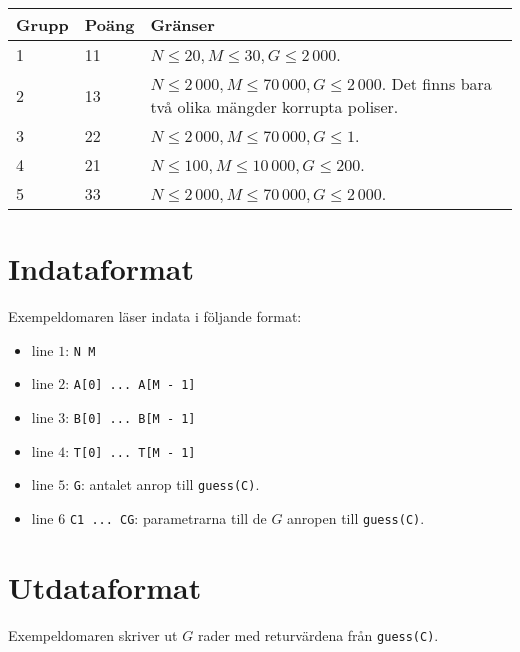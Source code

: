 \begin{tabular}{|l|l|l|}
  \hline
  \textbf{Grupp} & \textbf{Poäng} & \textbf{Gränser} \\ \hline
  1 & 11 & $N \le 20, M \le 30, G \le 2\,000$. \\ \hline
  2 & 13 & $N \le 2\,000, M \le 70\,000, G \le 2\,000$. Det finns bara två olika mängder korrupta poliser. \\ \hline
  3 & 22 & $N \le 2\,000, M \le 70\,000, G \le 1$. \\ \hline
  4 & 21 & $N \le 100, M \le 10\,000, G \le 200$. \\ \hline
  5 & 33 & $N \le 2\,000, M \le 70\,000, G \le 2\,000$. \\ \hline
\end{tabular}

\section*{Indataformat}
Exempeldomaren läser indata i följande format:

\begin{itemize}
  \item line $1$: \texttt{N M}
  \item line $2$: \texttt{A[0] ... A[M - 1]}
  \item line $3$: \texttt{B[0] ... B[M - 1]}
  \item line $4$: \texttt{T[0] ... T[M - 1]}
  \item line $5$: \texttt{G}: antalet anrop till \texttt{guess(C)}.
  \item line $6$ \texttt{C1 ... CG}: parametrarna till de $G$ anropen till \texttt{guess(C)}.
\end{itemize}

\section*{Utdataformat}
Exempeldomaren skriver ut $G$ rader med returvärdena från \texttt{guess(C)}.
